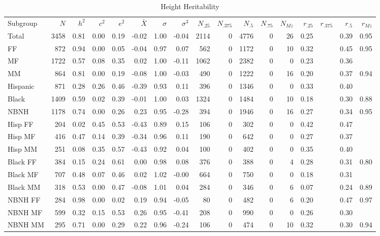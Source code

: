 \documentclass[a4paper]{article}
\begin{document}
\begin{table}[ht]
\begin{center}
\begin{tabular}{lr|rrr|rrr|rrrrr|rrrr}
 Subgroup & $N$ & $h^2$ & $c^2$ & $e^2$ & $\bar{X}$ & $\sigma$ & $\sigma^3$ & $N_{.25}$ & $N_{.375}$ & $N_{.5}$ & $N_{.75}$ & $N_{Mz}$ & $r_{.25}$ & $r_{.375}$ & $r_{.5}$ & $r_{Mz}$ \\ 
 Total & 3458 & 0.81 & 0.00 & 0.19 & -0.02 & 1.00 & -0.04 & 2114 & 0 & 4776 & 0 & 26 & 0.25 &  & 0.39 & 0.95 \\ 
   \hline
FF & 872 & 0.94 & 0.00 & 0.05 & -0.04 & 0.97 & 0.07 & 562 & 0 & 1172 & 0 & 10 & 0.32 &  & 0.45 & 0.95 \\ 
  MF & 1722 & 0.57 & 0.08 & 0.35 & 0.02 & 1.00 & -0.11 & 1062 & 0 & 2382 & 0 & 0 & 0.23 &  & 0.36 &  \\ 
  MM & 864 & 0.81 & 0.00 & 0.19 & -0.08 & 1.00 & -0.03 & 490 & 0 & 1222 & 0 & 16 & 0.20 &  & 0.37 & 0.94 \\ 
   \hline
Hispanic & 871 & 0.28 & 0.26 & 0.46 & -0.39 & 0.93 & 0.11 & 396 & 0 & 1346 & 0 & 0 & 0.33 &  & 0.40 &  \\ 
  Black & 1409 & 0.59 & 0.02 & 0.39 & -0.01 & 1.00 & 0.03 & 1324 & 0 & 1484 & 0 & 10 & 0.18 &  & 0.30 & 0.88 \\ 
  NBNH & 1178 & 0.74 & 0.00 & 0.26 & 0.23 & 0.95 & -0.28 & 394 & 0 & 1946 & 0 & 16 & 0.27 &  & 0.34 & 0.95 \\ 
   \hline
Hisp FF & 204 & 0.02 & 0.45 & 0.53 & -0.43 & 0.89 & 0.15 & 106 & 0 & 302 & 0 & 0 & 0.42 &  & 0.47 &  \\ 
  Hisp MF & 416 & 0.47 & 0.14 & 0.39 & -0.34 & 0.96 & 0.11 & 190 & 0 & 642 & 0 & 0 & 0.27 &  & 0.37 &  \\ 
  Hisp MM & 251 & 0.08 & 0.35 & 0.57 & -0.43 & 0.92 & 0.04 & 100 & 0 & 402 & 0 & 0 & 0.35 &  & 0.40 &  \\ 
   \hline
Black FF & 384 & 0.15 & 0.24 & 0.61 & 0.00 & 0.98 & 0.08 & 376 & 0 & 388 & 0 & 4 & 0.28 &  & 0.31 & 0.80 \\ 
  Black MF & 707 & 0.48 & 0.07 & 0.46 & 0.02 & 1.02 & -0.00 & 664 & 0 & 750 & 0 & 0 & 0.18 &  & 0.31 &  \\ 
  Black MM & 318 & 0.53 & 0.00 & 0.47 & -0.08 & 1.01 & 0.04 & 284 & 0 & 346 & 0 & 6 & 0.07 &  & 0.24 & 0.89 \\ 
   \hline
NBNH FF & 284 & 0.98 & 0.00 & 0.02 & 0.19 & 0.94 & -0.05 & 80 & 0 & 482 & 0 & 6 & 0.20 &  & 0.47 & 0.97 \\ 
  NBNH MF & 599 & 0.32 & 0.15 & 0.53 & 0.26 & 0.95 & -0.41 & 208 & 0 & 990 & 0 & 0 & 0.26 &  & 0.30 &  \\ 
  NBNH MM & 295 & 0.71 & 0.00 & 0.29 & 0.22 & 0.96 & -0.24 & 106 & 0 & 474 & 0 & 10 & 0.32 &  & 0.30 & 0.94 \\ 
  \end{tabular}
\caption{Height Heritability}
\label{tab:two}
\end{center}
\end{table}%
\end{document}
